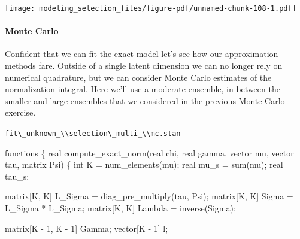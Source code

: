 \documentclass[
  letterpaper,
  DIV=11,
  numbers=noendperiod]{scrartcl}
\let\oldparagraph\paragraph
\renewcommand{\paragraph}[1]{\oldparagraph{#1}\mbox{}}
\newenvironment{Shaded}{\begin{snugshade}}{\end{snugshade}}
\newcommand{\DataTypeTok}[1]{\textcolor[rgb]{0.68,0.00,0.00}{#1}}
\newcommand{\DecValTok}[1]{\textcolor[rgb]{0.68,0.00,0.00}{#1}}
\newcommand{\KeywordTok}[1]{\textcolor[rgb]{0.00,0.23,0.31}{#1}}
\newcommand{\NormalTok}[1]{\textcolor[rgb]{0.00,0.23,0.31}{#1}}
\begin{document}
\texttt{[image: modeling\_selection\_files/figure-pdf/unnamed-chunk-108-1.pdf]}

\paragraph{Monte Carlo}\label{monte-carlo-1}

Confident that we can fit the exact model let's see how our
approximation methods fare. Outside of a single latent dimension we can
no longer rely on numerical quadrature, but we can consider Monte Carlo
estimates of the normalization integral. Here we'll use a moderate
ensemble, in between the smaller and large ensembles that we considered
in the previous Monte Carlo exercise.

\begin{codelisting}

\caption{\texttt{fit\textbackslash\_unknown\_\textbackslash\textbackslash selection\textbackslash\_multi\_\textbackslash\textbackslash mc.stan}}

\begin{Shaded}
\begin{Highlighting}[]
\KeywordTok{functions}\NormalTok{ \{}
    \DataTypeTok{real}\NormalTok{ compute\_exact\_norm(}\DataTypeTok{real}\NormalTok{ chi, }\DataTypeTok{real}\NormalTok{ gamma,}
                            \DataTypeTok{vector}\NormalTok{ mu, }\DataTypeTok{vector}\NormalTok{ tau, }\DataTypeTok{matrix}\NormalTok{ Psi) \{}
    \DataTypeTok{int}\NormalTok{ K = num\_elements(mu);}
    \DataTypeTok{real}\NormalTok{ mu\_s = sum(mu);}
    \DataTypeTok{real}\NormalTok{ tau\_s;}

    \DataTypeTok{matrix}\NormalTok{[K, K] L\_Sigma = diag\_pre\_multiply(tau, Psi);}
    \DataTypeTok{matrix}\NormalTok{[K, K] Sigma = L\_Sigma * L\_Sigma\textquotesingle{};}
    \DataTypeTok{matrix}\NormalTok{[K, K] Lambda = inverse(Sigma);}

    \DataTypeTok{matrix}\NormalTok{[K {-} }\DecValTok{1}\NormalTok{, K {-} }\DecValTok{1}\NormalTok{] Gamma;}
    \DataTypeTok{vector}\NormalTok{[K {-} }\DecValTok{1}\NormalTok{] l;}


\end{Highlighting}
\end{Shaded}
\end{codelisting}
\end{document}
